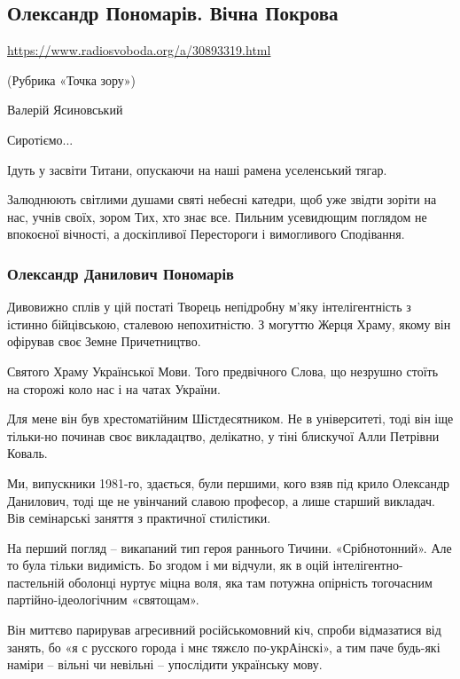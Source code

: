  
 

\subsection{Олександр Пономарів. Вічна Покрова}

\url{https://www.radiosvoboda.org/a/30893319.html}

(Рубрика «Точка зору»)

Валерій Ясиновський

Сиротіємо...

Ідуть у засвіти Титани, опускаючи на наші рамена уселенський тягар.

Залюднюють світлими душами святі небесні катедри, щоб уже звідти зоріти на нас, учнів своїх, зором Тих, хто знає все. Пильним усевидющим поглядом не впокоєної вічності, а доскіпливої Перестороги і вимогливого Сподівання.

\subsubsection{Олександр Данилович Пономарів}

Дивовижно сплів у цій постаті Творець непідробну м'яку інтелігентність з
істинно бійцівською, сталевою непохитністю. З могуттю Жерця Храму, якому він
офірував своє Земне Причетництво.

Святого Храму Української Мови. Того предвічного Слова, що незрушно стоїть на
сторожі коло нас і на чатах України. 

Для мене він був хрестоматійним Шістдесятником. Не в університеті, тоді він іще
тільки-но починав своє викладацтво, делікатно, у тіні блискучої Алли Петрівни
Коваль.

Ми, випускники 1981-го, здається, були першими, кого взяв під крило Олександр
Данилович, тоді ще не увінчаний славою професор, а лише старший викладач. Вів
семінарські заняття з практичної стилістики.

На перший погляд – викапаний тип героя раннього Тичини. «Срібнотонний». Але то
була тільки видимість. Бо згодом і ми відчули, як в оцій
інтелігентно-пастельній оболонці нуртує міцна воля, яка там потужна опірність
тогочасним партійно-ідеологічним «святощам».

Він миттєво парирував агресивний російськомовний кіч, спроби відмазатися від
занять, бо «я с русского города і мнє тяжєло по-укрАінскі», а тим паче будь-які
наміри – вільні чи невільні – упослідити українську мову.


